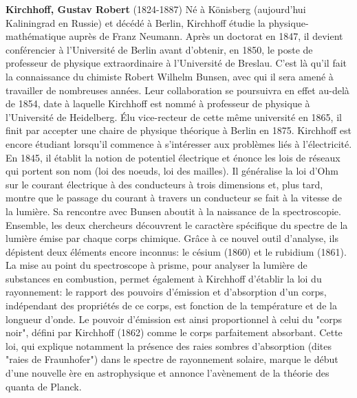 \textbf{Kirchhoff, Gustav Robert} (1824-1887) Né à Könisberg (aujourd'hui Kaliningrad en Russie) et décédé à Berlin, Kirchhoff étudie la physique-mathématique auprès de Franz Neumann. Après un doctorat en 1847, il devient conférencier à l'Université de Berlin avant d'obtenir, en 1850, le poste de professeur de physique extraordinaire à l'Université de Breslau. C'est là qu'il fait la connaissance du chimiste Robert Wilhelm Bunsen, avec qui il sera amené à travailler de nombreuses années. Leur collaboration se poursuivra en effet au-delà de 1854, date à laquelle Kirchhoff est nommé à professeur de physique à l'Université de Heidelberg. Élu vice-recteur de cette même université en 1865, il finit par accepter une chaire de physique théorique à Berlin en 1875. Kirchhoff est encore étudiant lorsqu'il commence à s'intéresser aux problèmes liés à l'électricité. En 1845, il établit la notion de potentiel électrique et énonce les lois de réseaux qui portent son nom (loi des noeuds, loi des mailles). Il généralise la loi d'Ohm sur le courant électrique à des conducteurs à trois dimensions et, plus tard, montre que le passage du courant à travers un conducteur se fait à la vitesse de la lumière. Sa rencontre avec Bunsen aboutit à la naissance de la spectroscopie. Ensemble, les deux chercheurs découvrent le caractère spécifique du spectre de la lumière émise par chaque corps chimique. Grâce à ce nouvel outil d'analyse, ils dépistent deux éléments encore inconnus: le césium (1860) et le rubidium (1861). La mise au point du spectroscope à prisme, pour analyser la lumière de substances en combustion, permet également à Kirchhoff d'établir la loi du rayonnement: le rapport des pouvoirs d'émission et d'absorption d'un corps, indépendant des propriétés de ce corps, est fonction de la température et de la longueur d'onde. Le pouvoir d'émission est ainsi proportionnel à celui du "corps noir", défini par Kirchhoff (1862) comme le corps parfaitement absorbant. Cette loi, qui explique notamment la présence des raies sombres d'absorption (dites "raies de Fraunhofer") dans le spectre de rayonnement solaire, marque le début d'une nouvelle ère en astrophysique et annonce l'avènement de la théorie des quanta de Planck.

